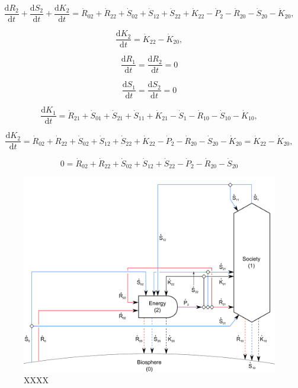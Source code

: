 \begin{equation} \label{eq:B-CV_R_dot_2}
	\frac{\mathrm{d}R_{2}}{\mathrm{d}t} + \frac{\mathrm{d}S_{2}}{\mathrm{d}t}
	+ \frac{\mathrm{d}K_{2}}{\mathrm{d}t}
	=  \dot{R}_{02} + \dot{R}_{22} 
	+ \dot{S}_{02} + \dot{S}_{12} + \dot{S}_{22} 
	+ \dot{K}_{22}
	- \dot{P}_{2}
	- \dot{R}_{20} 
	- \dot{S}_{20} 
	- \dot{K}_{20},
\end{equation}

\begin{equation} \label{eq:B-CV_K_dot_2}
	\frac{\mathrm{d}K_{2}}{\mathrm{d}t}
	=  \dot{K}_{22} - \dot{K}_{20},
\end{equation}

\begin{equation}\label{eq:dR_dt_zero}
	\frac{\mathrm{d}R_{1}}{\mathrm{d}t} = \frac{\mathrm{d}R_{2}}{\mathrm{d}t} = 0
\end{equation}

\begin{equation}\label{eq:dS_dt_zero}
	\frac{\mathrm{d}S_{1}}{\mathrm{d}t} = \frac{\mathrm{d}S_{2}}{\mathrm{d}t} = 0
\end{equation}

\begin{equation} \label{eq:B-CV_R_dot_1b}
	\frac{\mathrm{d}K_{1}}{\mathrm{d}t}
	=  \dot{R}_{21} 
	+ \dot{S}_{01} + \dot{S}_{21} + \dot{S}_{11}
	+ \dot{K}_{21} 
	- \dot{S}_{1}
	- \dot{R}_{10} 
	- \dot{S}_{10} 
	- \dot{K}_{10},
\end{equation}

\begin{equation} \label{eq:B-CV_R_dot_2b}
	\frac{\mathrm{d}K_{2}}{\mathrm{d}t}
	=  \dot{R}_{02} + \dot{R}_{22} 
	+ \dot{S}_{02} + \dot{S}_{12} + \dot{S}_{22} 
	+ \dot{K}_{22}
	- \dot{P}_{2}
	- \dot{R}_{20} 
	- \dot{S}_{20} 
	- \dot{K}_{20}
	= \dot{K}_{22} - \dot{K}_{20},
\end{equation}

\begin{equation} \label{eq:B-CV_R_dot_2c}
	0
	=  \dot{R}_{02} + \dot{R}_{22} 
	+ \dot{S}_{02} + \dot{S}_{12} + \dot{S}_{22} 
	- \dot{P}_{2}
	- \dot{R}_{20} 
	- \dot{S}_{20} 
\end{equation}

\begin{figure}[h!]
\centering
\includegraphics[width=0.8\linewidth]{Part_1/Chapter_Materials/images/2_sector_materials.pdf}
\caption{XXXX}
\label{fig:B_materials}
\end{figure}

